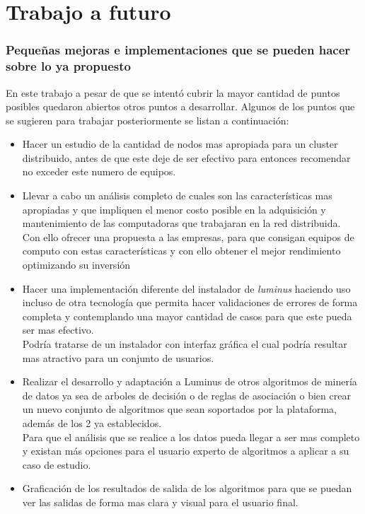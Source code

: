 \section{Trabajo a futuro}
\subsubsection{Pequeñas mejoras e implementaciones que se pueden hacer sobre lo ya propuesto}
En este trabajo a pesar de que se intentó cubrir la mayor cantidad de puntos posibles quedaron abiertos otros puntos a desarrollar. Algunos de los puntos que se sugieren para trabajar posteriormente se listan a continuación:
\begin{itemize}
	\item Hacer un estudio de la cantidad de nodos mas apropiada para un cluster distribuido, antes de que este deje de ser efectivo para entonces recomendar no exceder este numero de equipos.
	\item Llevar a cabo un análisis completo de cuales son las características mas apropiadas y que impliquen el menor costo posible en la adquisición y mantenimiento de las computadoras que trabajaran en la red distribuida.
	\\
	Con ello ofrecer una propuesta a las empresas, para que consigan equipos de computo con estas características y con ello obtener el mejor rendimiento optimizando su inversión
	\item Hacer una implementación diferente del instalador de \emph{luminus} haciendo uso incluso de otra tecnología que permita hacer validaciones de errores de forma completa y contemplando una mayor cantidad de casos para que este pueda ser mas efectivo.\\ 
	Podría tratarse de un instalador con interfaz gráfica el cual podría resultar mas atractivo para un conjunto de usuarios. 
	\item Realizar el desarrollo y adaptación a Luminus de otros algoritmos de minería de datos ya sea de arboles de decisión o de reglas de asociación o bien crear un nuevo conjunto de algoritmos que sean soportados por la plataforma, además de los 2 ya establecidos. 
	\\
	Para que el análisis que se realice a los datos pueda llegar a ser mas completo y existan más opciones para el usuario experto de algoritmos a aplicar a su caso de estudio.
	\item Graficación de los resultados de salida de los algoritmos para que se puedan ver las salidas de forma mas clara y visual para el usuario final.\\

\end{itemize}
